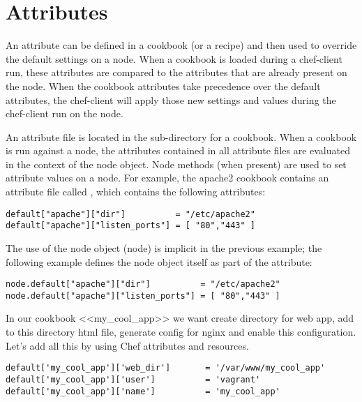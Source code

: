 \section{Attributes}
\label{sec:cookbook-attributes}

An attribute can be defined in a cookbook (or a recipe) and then used to override the default settings on a node. When a cookbook is loaded during a chef-client run, these attributes are compared to the attributes that are already present on the node. When the cookbook attributes take precedence over the default attributes, the chef-client will apply those new settings and values during the chef-client run on the node.

An attribute file is located in the  sub-directory for a cookbook. When a cookbook is run against a node, the attributes contained in all attribute files are evaluated in the context of the node object. Node methods (when present) are used to set attribute values on a node. For example, the apache2 cookbook contains an attribute file called , which contains the following attributes:

\begin{lstlisting}[label=lst:cookbook-attributes1]
default["apache"]["dir"]          = "/etc/apache2"
default["apache"]["listen_ports"] = [ "80","443" ]
\end{lstlisting}

The use of the node object (node) is implicit in the previous example; the following example defines the node object itself as part of the attribute:

\begin{lstlisting}[label=lst:cookbook-attributes2]
node.default["apache"]["dir"]          = "/etc/apache2"
node.default["apache"]["listen_ports"] = [ "80","443" ]
\end{lstlisting}

In our cookbook <<my\_cool\_app>> we want create directory for web app, add to this directory html file, generate config for nginx and enable this configuration. Let's add all this by using Chef attributes and resources.

\begin{lstlisting}[label=lst:cookbook-attributes3,title=my-server-cloud/site-cookbooks/my\_cool\_app/attributes/default.rb]
default['my_cool_app']['web_dir']       = '/var/www/my_cool_app'
default['my_cool_app']['user']          = 'vagrant'
default['my_cool_app']['name']          = 'my_cool_app'
\end{lstlisting}


